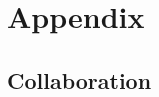 \documentclass[18pt]{beamer}
\begin{document}
%
%




\appendix
\beginbackup

\section{Appendix}
\subsection{Collaboration}
\end{document}
